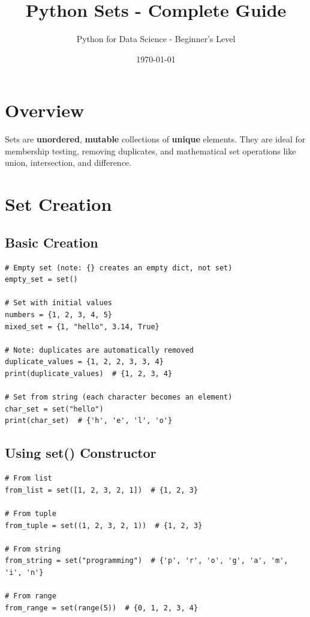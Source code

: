 \documentclass[12pt,a4paper]{article}
\title{\textbf{Python Sets - Complete Guide}}
\author{Python for Data Science - Beginner's Level}
\date{\today}
\begin{document}
\maketitle
\tableofcontents
\newpage

\section{Overview}

Sets are \textbf{unordered}, \textbf{mutable} collections of \textbf{unique} elements. They are ideal for membership testing, removing duplicates, and mathematical set operations like union, intersection, and difference.

\section{Set Creation}

\subsection{Basic Creation}

\begin{lstlisting}
# Empty set (note: {} creates an empty dict, not set)
empty_set = set()

# Set with initial values
numbers = {1, 2, 3, 4, 5}
mixed_set = {1, "hello", 3.14, True}

# Note: duplicates are automatically removed
duplicate_values = {1, 2, 2, 3, 3, 4}
print(duplicate_values)  # {1, 2, 3, 4}

# Set from string (each character becomes an element)
char_set = set("hello")
print(char_set)  # {'h', 'e', 'l', 'o'}
\end{lstlisting}

\subsection{Using set() Constructor}

\begin{lstlisting}
# From list
from_list = set([1, 2, 3, 2, 1])  # {1, 2, 3}

# From tuple
from_tuple = set((1, 2, 3, 2, 1))  # {1, 2, 3}

# From string
from_string = set("programming")  # {'p', 'r', 'o', 'g', 'a', 'm', 'i', 'n'}

# From range
from_range = set(range(5))  # {0, 1, 2, 3, 4}
\end{lstlisting}
\end{document}
